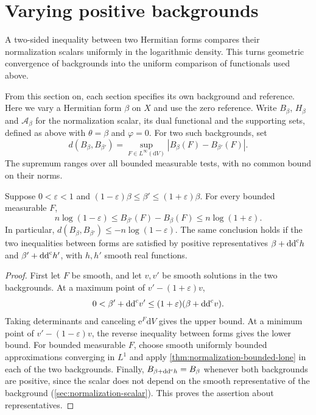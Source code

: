 \section{Varying positive backgrounds}\label{sec:geometric-normalization-stability}

A two-sided inequality between two Hermitian forms compares their normalization scalars uniformly in the logarithmic density. This turns geometric convergence of backgrounds into the uniform comparison of functionals used above.

From this section on, each section specifies its own background and reference. Here we vary a Hermitian form $\beta$ on $X$ and use the zero reference. Write $B_\beta$, $H_\beta$ and $\mathcal A_\beta$ for the normalization scalar, its dual functional and the supporting sets, defined as above with $\theta=\beta$ and $\varphi=0$. For two such backgrounds, set
\[
 d(B_\beta,B_{\beta'})=\sup_{F\in L^\infty(\mathrm{d}V)}|B_\beta(F)-B_{\beta'}(F)|.
\]
The supremum ranges over all bounded measurable tests, with no common bound on their norms.

\begin{theorem}\label{thm:geometric-normalization-comparison}
Suppose $0<\varepsilon<1$ and $(1-\varepsilon)\beta\leq\beta'\leq(1+\varepsilon)\beta$. For every bounded measurable $F$,
\begin{equation}\label{eq:geometric-normalization-comparison}
 n\log(1-\varepsilon)\leq B_{\beta'}(F)-B_\beta(F)\leq n\log(1+\varepsilon).
\end{equation}
In particular, $d(B_\beta,B_{\beta'})\leq-n\log(1-\varepsilon)$. The same conclusion holds if the two inequalities between forms are satisfied by positive representatives $\beta+\mathrm{dd}^{\mathrm{c}} h$ and $\beta'+\mathrm{dd}^{\mathrm{c}} h'$, with $h,h'$ smooth real functions.
\end{theorem}
\begin{proof}
First let $F$ be smooth, and let $v,v'$ be smooth solutions in the two backgrounds. At a maximum point of $v'-(1+\varepsilon)v$,
\[
 0<\beta'+\mathrm{dd}^{\mathrm{c}} v'\leq(1+\varepsilon)(\beta+\mathrm{dd}^{\mathrm{c}} v).
\]
Taking determinants and canceling $\mathrm{e}^F\mathrm{d}V$ gives the upper bound. At a minimum point of $v'-(1-\varepsilon)v$, the reverse inequality between forms gives the lower bound. For bounded measurable $F$, choose smooth uniformly bounded approximations converging in $L^1$ and apply \cref{thm:normalization-bounded-lone} in each of the two backgrounds. Finally, $B_{\beta+\mathrm{dd}^{\mathrm{c}} h}=B_\beta$ whenever both backgrounds are positive, since the scalar does not depend on the smooth representative of the background (\cref{sec:normalization-scalar}). This proves the assertion about representatives.
\end{proof}

